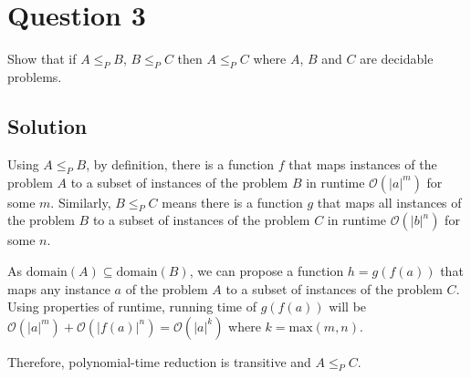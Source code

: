 
\section*{Question 3}

Show that if $A \leq_P B$, $B \leq_P C$ then $A \leq_P C$ where $A$, $B$ and $C$ are decidable problems.

\subsection*{Solution}

Using $A \leq_P B$, by definition, there is a function $f$ that maps instances of the problem $A$ to a subset of instances of the problem $B$ in runtime $\mathcal{O}(|a|^m)$ for some $m$.
Similarly, $B \leq_P C$ means there is a function $g$ that maps all instances of the problem $B$ to a subset of instances of the problem $C$ in runtime $\mathcal{O}(|b|^n)$ for some $n$.

As $\text{domain}(A) \subseteq \text{domain}(B)$, we can propose a function $h = g(f(a))$ that maps any instance $a$ of the problem $A$ to a subset of instances of the problem $C$.
Using properties of runtime, running time of $g(f(a))$ will be $\mathcal{O}(|a|^m) + \mathcal{O}(|f(a)|^n) = \mathcal{O}(|a|^k)$ where $k = \text{max}(m,n)$.

Therefore, polynomial-time reduction is transitive and $A \leq_P C$.
